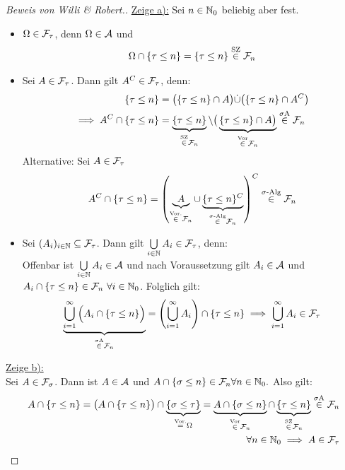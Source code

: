 \documentclass[12pt,a4paper]{article}
\begin{document}
\begin{proof}[Beweis von Willi \& Robert.]\enter
\underline{Zeige a):} Sei $n\in\mathbb{N}_0$ beliebig aber fest.
\begin{itemize} 
\item $\Omega\in\mathcal{F}_\tau$, denn $\Omega\in\mathcal{A}$ und 
\begin{align*}
\Omega\cap\lbrace\tau\leq n\rbrace=\lbrace\tau\leq n\rbrace \stackrel{\text{SZ}}{\in} \mathcal{F}_n
\end{align*}
\item Sei $A \in \mathcal{F}_\tau$. Dann gilt $A^C \in \mathcal{F}_\tau$, denn:
\begin{align*}
\lbrace\tau\leq n\rbrace &=\big(\lbrace\tau\leq n\rbrace\cap A\big)\dot{\cup}\big(\lbrace\tau\leq n\rbrace\cap A^C\big)\\
\implies A^C\cap\lbrace\tau\leq n\rbrace&=\underbrace{\lbrace\tau\leq n\rbrace}_{\stackrel{\text{SZ}}{\in}\mathcal{F}_n}\setminus\big(\underbrace{\lbrace\tau\leq n\rbrace\cap A\big)}_{\stackrel{\text{Vor}}{\in}\mathcal{F}_n}\stackrel{\sigma\text{A}}{\in}\mathcal{F}_n
\end{align*}
Alternative: Sei $A \in \mathcal{F}_\tau$
\begin{align*}
	A^C\cap \lbrace \tau \leq n \rbrace = \left(\underbrace{A}_{\stackrel{\text{Vor.}}{\in} \mathcal{F}_n} \cup \underbrace{\lbrace \tau \leq n \rbrace^C}_{\stackrel{\sigma\text{-Alg}}{\in} \mathcal{F}_n} \right)^C \stackrel{\sigma\text{-Alg}}{\in}\mathcal{F}_n
\end{align*}

\item Sei $(A_i)_{i\in\mathbb{N}}\subseteq\mathcal{F}_\tau$. Dann gilt $\bigcup\limits_{i\in\mathbb{N}} A_i  \in \mathcal{F}_\tau$, denn:\\
Offenbar ist $\bigcup\limits_{i\in\mathbb{N}} A_i  \in\mathcal{A}$ und nach Voraussetzung gilt $A_i\in\mathcal{A}$ und\\ $A_i\cap\lbrace\tau\leq n\rbrace\in\mathcal{F}_n~\forall i\in\mathbb{N}_0$. Folglich gilt:
\begin{align*}
\underbrace{\bigcup\limits_{i=1}^{\infty} \Big (A_i \cap \{\tau \leq n\} \Big )}_{\stackrel{\sigma\text{A}}{\in} \mathcal{F}_n} = \left( \bigcup\limits_{i=1}^{\infty} A_i \right)\cap \{\tau \leq n\} \implies  \bigcup\limits_{i=1}^{\infty} A_i \in \mathcal{F}_\tau
\end{align*}
\end{itemize}

\underline{Zeige b):}\\
Sei $A\in\mathcal{F}_\sigma$. Dann ist $A\in\mathcal{A}$ und $A\cap\lbrace\sigma\leq n\rbrace\in\mathcal{F}_n\forall n\in\mathbb{N}_0.$ Also gilt:
\begin{align*}
A \cap \lbrace\tau \leq n\rbrace
\stackrel{}{=}
\big(A \cap\lbrace\tau \leq n\rbrace\big)\cap\underbrace{\lbrace\sigma\leq\tau\rbrace}_{\stackrel{\text{Vor.}}{=}\Omega}
=\underbrace{A\cap\lbrace\sigma\leq n\rbrace}_{\stackrel{\text{Vor}}{\in}\mathcal{F}_n}\cap\underbrace{\lbrace\tau\leq n\rbrace}_{\stackrel{\text{SZ}}{\in}\mathcal{F}_n} \stackrel{\sigma\text{A}}{\in} \mathcal{F}_n\\ \quad \forall n \in \mathbb{N}_0
\implies A\in\mathcal{F}_\tau
\end{align*}


\end{proof}
\end{document}
